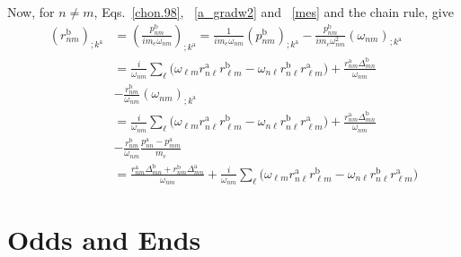Now, for $n \ne m$, Eqs.~\eqref{chon.98},
~\eqref{a_gradw2} and 
~\eqref{mes} and the chain rule, give
\begin{align}\label{a_rgendevn}
(r^{\mathrm{b}}_{nm})_{;k^{\mathrm{a}}}&=\left(\frac{p^{\mathrm{b}}_{nm}}{im_e\omega_{nm}}\right)_{;k^{\mathrm{a}}}
=
\frac{1}
{im_e\omega_{nm}}
\left(
p^{\mathrm{b}}_{nm}
\right)_{;k^{\mathrm{a}}}
-
\frac{p^{\mathrm{b}}_{nm}}
{im_e\omega^2_{nm}}
\left(
\omega_{nm}
\right)_{;k^{\mathrm{a}}}
\nonumber \\
&=
\frac{i}{\omega_{nm}}
\sum_{\ell}
\bigg(
\omega_{\ell m}
r^{\mathrm{a}}_{n\ell}
r^{\mathrm{b}}_{\ell m}
-
\omega_{n\ell}
r^{\mathrm{b}}_{n\ell}
r^{\mathrm{a}}_{\ell m}
\bigg)
+
\frac{r^{\mathrm{a}}_{nm}
\Delta^{\mathrm{b}}_{mn}}
{\omega_{nm}}
\nonumber \\
&
-
\frac{r^{\mathrm{b}}_{nm}}
{\omega_{nm}}
\left(
\omega_{nm}
\right)_{;k^{\mathrm{a}}}
\nonumber \\
&=
\frac{i}{\omega_{nm}}
\sum_{\ell}
\bigg(
\omega_{\ell m}
r^{\mathrm{a}}_{n\ell}
r^{\mathrm{b}}_{\ell m}
-
\omega_{n\ell}
r^{\mathrm{b}}_{n\ell}
r^{\mathrm{a}}_{\ell m}
\bigg)
+
\frac{r^{\mathrm{a}}_{nm}
\Delta^{\mathrm{b}}_{mn}}
{\omega_{nm}}
\nonumber \\
&
-
\frac{r^{\mathrm{b}}_{nm}}
{\omega_{nm}}
\frac{p^{\mathrm{a}}_{nn}-p^{\mathrm{a}}_{mm}}{m_e}
\nonumber \\
&=
\frac{
r^{\mathrm{a}}_{nm}
\Delta^{\mathrm{b}}_{mn}
+r^{\mathrm{b}}_{nm}
\Delta^{\mathrm{a}}_{mn}
}
{\omega_{nm}}
+
\frac{i}{\omega_{nm}}
\sum_{\ell}
\bigg(
\omega_{\ell m}
r^{\mathrm{a}}_{n\ell}
r^{\mathrm{b}}_{\ell m}
-
\omega_{n\ell}
r^{\mathrm{b}}_{n\ell}
r^{\mathrm{a}}_{\ell m}
\bigg)
\end{align}



\section{Odds and Ends}

